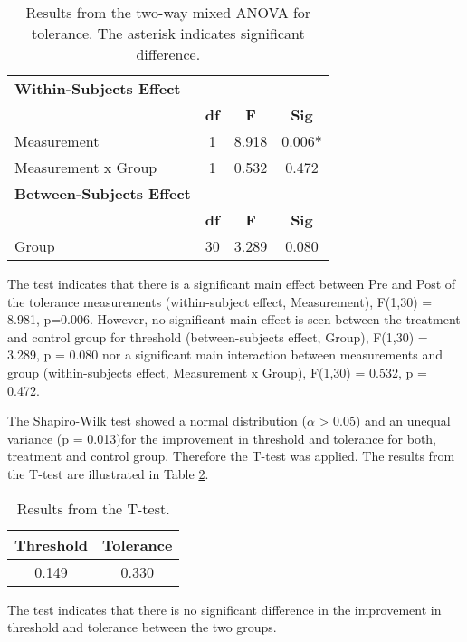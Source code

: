 \begin{table}[ht]
\caption{Results from the two-way mixed ANOVA for tolerance. The asterisk indicates significant difference.}
\centering
\begin{tabular}{l c c c}
\hline \hline
\textbf{Within-Subjects Effect} \\ 
& \textbf{df} & \textbf{F} & \textbf{Sig} \\ [0.5ex] %
\hline
Measurement & 1 &  8.918 &  0.006* \\
Measurement x Group & 1 & 0.532 & 0.472 \\
\hline \hline
\textbf{Between-Subjects Effect} \\ 
 & \textbf{df} & \textbf{F} & \textbf{Sig} \\ [0.5ex] %
\hline
Group & 30 & 3.289 &  0.080 \\
\hline
\end{tabular}
\label{table:TWOWAYANOVA2}
\end{table}

\noindent
The test indicates that there is a significant main effect between Pre and Post of the tolerance measurements (within-subject effect, Measurement), F(1,30) = 8.981, p=0.006. However, no significant main effect is seen between the treatment and control group for threshold (between-subjects effect, Group), F(1,30) = 3.289, p = 0.080 nor a significant main interaction between  measurements and group (within-subjects effect, Measurement x Group), F(1,30) = 0.532, p = 0.472.

The Shapiro-Wilk test showed a normal distribution ($\alpha$ > 0.05) and an unequal variance (p = 0.013)for the improvement in threshold and tolerance for both, treatment and control group. Therefore the T-test was applied. The results from the T-test are illustrated in Table \ref{table:TTEST}. 

\begin{table}[ht]
\caption{Results from the T-test.}
\centering
\begin{tabular}{c c}
\hline\hline
\textbf{Threshold} & \textbf{Tolerance} \\ [0.5ex] %
\hline
 0.149 &  0.330 \\
\hline
\end{tabular}
\label{table:TTEST}
\end{table}

\noindent
The test indicates that there is no significant difference in the improvement in threshold and tolerance between the two groups.